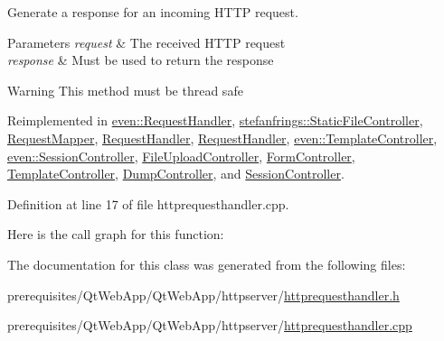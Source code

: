 Generate a response for an incoming H\+T\+TP request. 
\begin{DoxyParams}{Parameters}
{\em request} & The received H\+T\+TP request \\
\hline
{\em response} & Must be used to return the response \\
\hline
\end{DoxyParams}
\begin{DoxyWarning}{Warning}
This method must be thread safe 
\end{DoxyWarning}


Reimplemented in \mbox{\hyperlink{classeven_1_1_request_handler_ad7b53aca14b37e95101c3e80ddccad33}{even\+::\+Request\+Handler}}, \mbox{\hyperlink{classstefanfrings_1_1_static_file_controller_a88bbd874c62c8335d0775629b22871a1}{stefanfrings\+::\+Static\+File\+Controller}}, \mbox{\hyperlink{class_request_mapper_a5faa3e99e8599b260d2c9ec1479b6419}{Request\+Mapper}}, \mbox{\hyperlink{class_request_handler_a46dbcda155cd987e45d55b2941dbfd71}{Request\+Handler}}, \mbox{\hyperlink{class_request_handler_a46dbcda155cd987e45d55b2941dbfd71}{Request\+Handler}}, \mbox{\hyperlink{classeven_1_1_template_controller_ad34c48cf60094e0deb73aa7145e93eac}{even\+::\+Template\+Controller}}, \mbox{\hyperlink{classeven_1_1_session_controller_a2eb65af29d53ff51d709cc892611d5a9}{even\+::\+Session\+Controller}}, \mbox{\hyperlink{class_file_upload_controller_adfa8811a91e6f1ddf7f28f4d98cb1679}{File\+Upload\+Controller}}, \mbox{\hyperlink{class_form_controller_af327951d82e5b89df6e006c370540b7a}{Form\+Controller}}, \mbox{\hyperlink{class_template_controller_ad34c48cf60094e0deb73aa7145e93eac}{Template\+Controller}}, \mbox{\hyperlink{class_dump_controller_ab2d5b920d9b2ec9310d2e57ed1e8e32f}{Dump\+Controller}}, and \mbox{\hyperlink{class_session_controller_a2eb65af29d53ff51d709cc892611d5a9}{Session\+Controller}}.



Definition at line 17 of file httprequesthandler.\+cpp.

Here is the call graph for this function\+:


The documentation for this class was generated from the following files\+:\begin{DoxyCompactItemize}
\item 
prerequisites/\+Qt\+Web\+App/\+Qt\+Web\+App/httpserver/\mbox{\hyperlink{httprequesthandler_8h}{httprequesthandler.\+h}}\item 
prerequisites/\+Qt\+Web\+App/\+Qt\+Web\+App/httpserver/\mbox{\hyperlink{httprequesthandler_8cpp}{httprequesthandler.\+cpp}}\end{DoxyCompactItemize}
